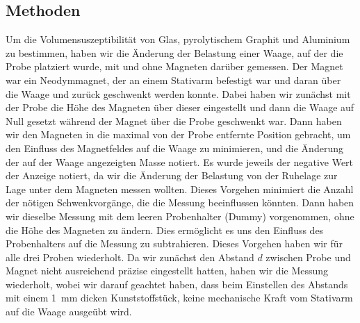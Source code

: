 \documentclass[
	a4paper,
	12pt,
	pagesize,
	ngerman
]{scrartcl}
\begin{document}
	\subsection{Methoden}
	Um die Volumensuszeptibilität von Glas, pyrolytischem Graphit und Aluminium zu bestimmen, haben wir die Änderung der Belastung einer Waage, auf der die Probe platziert wurde, mit und ohne Magneten darüber gemessen. Der Magnet war ein Neodymmagnet, der an einem Stativarm befestigt war und daran über die Waage und zurück geschwenkt werden konnte. Dabei haben wir zunächst mit der Probe die Höhe des Magneten über dieser eingestellt und dann die Waage auf Null gesetzt während der Magnet über die Probe geschwenkt war. Dann haben wir den Magneten in die maximal von der Probe entfernte Position gebracht, um den Einfluss des Magnetfeldes auf die Waage zu minimieren, und die Änderung der auf der Waage angezeigten Masse notiert. Es wurde jeweils der negative Wert der Anzeige notiert, da wir die Änderung der Belastung von der Ruhelage zur Lage unter dem Magneten messen wollten. Dieses Vorgehen minimiert die Anzahl der nötigen Schwenkvorgänge, die die Messung beeinflussen könnten. Dann haben wir dieselbe Messung mit dem leeren Probenhalter (Dummy) vorgenommen, ohne die Höhe des Magneten zu ändern. Dies ermöglicht es uns den Einfluss des Probenhalters auf die Messung zu subtrahieren. Dieses Vorgehen haben wir für alle drei Proben wiederholt. Da wir zunächst den Abstand $d$ zwischen Probe und Magnet nicht ausreichend präzise eingestellt hatten, haben wir die Messung wiederholt, wobei wir darauf geachtet haben, dass beim Einstellen des Abstands mit einem \SI{1}{\milli \meter} dicken Kunststoffstück, keine mechanische Kraft vom Stativarm auf die Waage ausgeübt wird. 
\end{document}
